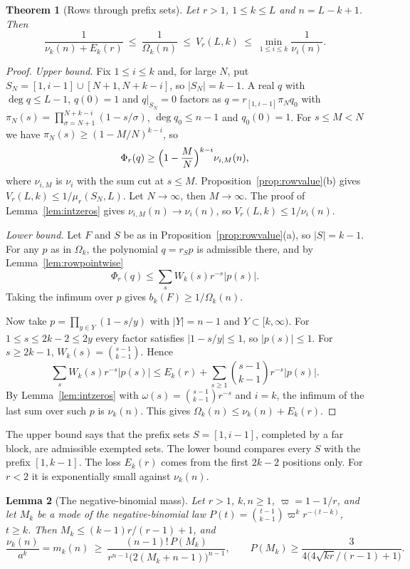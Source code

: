\documentclass[11pt]{article}
\newtheorem{theorem}{Theorem}[section]
\newtheorem{lemma}[theorem]{Lemma}
\begin{document}
\begin{theorem}[Rows through prefix sets]\label{thm:prefixrows}
Let $r>1$, $1\le k\le L$ and $n=L-k+1$.  Then
\begin{equation}\label{eq:prefixsandwich}
  \frac1{\nu_k(n)+E_k(r)}\ \le\ \frac1{\Omega_k(n)}\ \le\ V_r(L,k)\ \le\
  \min_{1\le i\le k}\frac1{\nu_i(n)} .
\end{equation}
\end{theorem}

\begin{proof}
\emph{Upper bound.}  Fix $1\le i\le k$ and, for large $N$, put
$S_N=[1,i-1]\cup[N+1,N+k-i]$, so $|S_N|=k-1$.  A real $q$ with
$\deg q\le L-1$, $q(0)=1$ and $q|_{S_N}=0$ factors as
$q=r_{[1,i-1]}\pi_Nq_0$ with $\pi_N(s)=\prod_{\sigma=N+1}^{N+k-i}(1-s/\sigma)$,
$\deg q_0\le n-1$ and $q_0(0)=1$.  For $s\le M<N$ we have
$\pi_N(s)\ge(1-M/N)^{k-i}$, so
\[
  \Phi_r(q)\ge\Bigl(1-\frac MN\Bigr)^{k-i}\nu_{i,M}(n),
\]
where $\nu_{i,M}$ is $\nu_i$ with the sum cut at $s\le M$.
Proposition~\ref{prop:rowvalue}(b) gives
$V_r(L,k)\le1/\mu_r(S_N,L)$.  Let $N\to\infty$, then $M\to\infty$.  The
proof of Lemma~\ref{lem:intzeros} gives $\nu_{i,M}(n)\to\nu_i(n)$, so
$V_r(L,k)\le1/\nu_i(n)$.

\emph{Lower bound.}  Let $F$ and $S$ be as in
Proposition~\ref{prop:rowvalue}(a), so $|S|=k-1$.  For any $p$ as in
$\Omega_k$, the polynomial $q=r_Sp$ is admissible there, and by
Lemma~\ref{lem:rowpointwise}
\[
  \Phi_r(q)\le\sum_sW_k(s)r^{-s}|p(s)| .
\]
Taking the infimum over $p$ gives $b_k(F)\ge1/\Omega_k(n)$.

Now take $p=\prod_{y\in Y}(1-s/y)$ with $|Y|=n-1$ and $Y\subset[k,\infty)$.
For $1\le s\le2k-2\le2y$ every factor satisfies $|1-s/y|\le1$, so
$|p(s)|\le1$.  For $s\ge2k-1$, $W_k(s)=\binom{s-1}{k-1}$.  Hence
\[
  \sum_sW_k(s)r^{-s}|p(s)|\le E_k(r)+\sum_{s\ge1}\binom{s-1}{k-1}r^{-s}|p(s)| .
\]
By Lemma~\ref{lem:intzeros} with $\omega(s)=\binom{s-1}{k-1}r^{-s}$ and
$i=k$, the infimum of the last sum over such $p$ is $\nu_k(n)$.  This gives
$\Omega_k(n)\le\nu_k(n)+E_k(r)$.
\end{proof}

The upper bound says that the prefix sets $S=[1,i-1]$, completed by a far
block, are admissible exempted sets.  The lower bound compares every $S$
with the prefix $[1,k-1]$.  The loss $E_k(r)$ comes from the first $2k-2$
positions only.  For $r<2$ it is exponentially small against $\nu_k(n)$.

\begin{lemma}[The negative-binomial mass]\label{lem:nbmass}
Let $r>1$, $k,n\ge1$, $\varpi=1-1/r$, and let $M_k$ be a mode of the
negative-binomial law $P(t)=\binom{t-1}{k-1}\varpi^k r^{-(t-k)}$, $t\ge k$.
Then $M_k\le(k-1)r/(r-1)+1$, and
\[
  \frac{\nu_k(n)}{a^k}=m_k(n)\ \ge\
  \frac{(n-1)!\,P(M_k)}{r^{n-1}\bigl(2(M_k+n-1)\bigr)^{n-1}},
  \qquad
  P(M_k)\ge\frac3{4\bigl(4\sqrt{kr}/(r-1)+1\bigr)} .
\]
\end{lemma}
\end{document}
